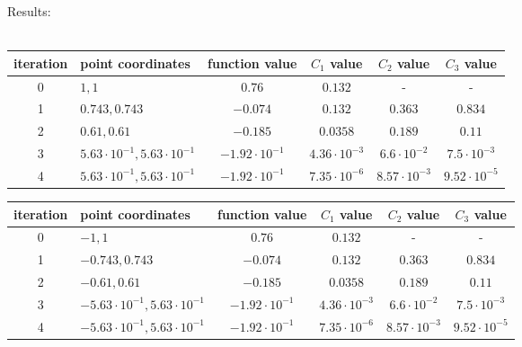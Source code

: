 \documentclass[12pt]{article}
\begin{document}
	\begin{table}[H]
		Results: \\ \\
		\begin{tabularx}{\textwidth}{c|X|c|c|c|c|}
			iteration & point coordinates & function value & $C_1$ value & $C_2$ value & $C_3$ value\\
			\hline
			0 & $1, 1$ & $0.76$ & $0.132$ & - & - \\
			\hline					
			1 & $0.743, 0.743$ & $-0.074$ & $0.132$ & $0.363$ & $0.834$ \\ 
			\hline 
			2 & $0.61, 0.61$ & $-0.185$ & $0.0358$ & $0.189$ & $0.11$ \\ 
			\hline
			3 & $5.63\cdot10^{-1}, 5.63\cdot10^{-1}$  & $-1.92\cdot10^{-1}$ & $4.36\cdot10^{-3}$ & $6.6\cdot10^{-2}$ & $7.5\cdot10^{-3}$ \\ 
			\hline
			4 & $5.63\cdot10^{-1}, 5.63\cdot10^{-1}$  & $-1.92\cdot10^{-1}$ &
			$7.35\cdot10^{-6}$ & $8.57\cdot10^{-3}$ & $9.52\cdot10^{-5}$ \\ \hline
		\end{tabularx}	
	\end{table}		
	\begin{table}[H]
		\begin{tabularx}{\textwidth}{c|X|c|c|c|c|}
			iteration & point coordinates & function value & $C_1$ value & $C_2$ value & $C_3$ value\\
			\hline	
			0 & $-1, 1$ & $0.76$ & $0.132$ & - & - \\
			\hline					
			1 & $-0.743, 0.743$ & $-0.074$ & $0.132$ & $0.363$ & $0.834$ \\ 
			\hline 
			2 & $-0.61, 0.61$ & $-0.185$ & $0.0358$ & $0.189$ & $0.11$ \\ 
			\hline
			3 & $-5.63\cdot10^{-1}, 5.63\cdot10^{-1}$  & $-1.92\cdot10^{-1}$ & $4.36\cdot10^{-3}$ & $6.6\cdot10^{-2}$ & $7.5\cdot10^{-3}$ \\ 
			\hline
			4 & $-5.63\cdot10^{-1}, 5.63\cdot10^{-1}$  & $-1.92\cdot10^{-1}$ &
			$7.35\cdot10^{-6}$ & $8.57\cdot10^{-3}$ & $9.52\cdot10^{-5}$ \\ \hline
		\end{tabularx}		 
	\end{table}
\end{document}
